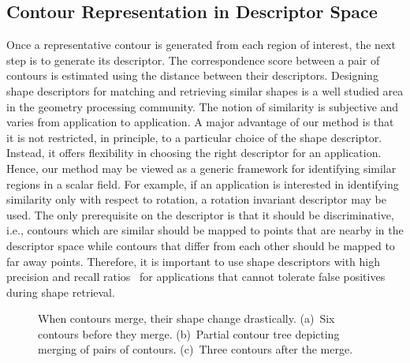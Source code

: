 \documentclass[review,journal]{vgtc}         %
\begin{document}
\subsection{Contour Representation in Descriptor Space}
Once a representative contour is generated from each region of interest, the next step
is to generate its descriptor. The correspondence score between a pair of
contours is estimated using the distance between their descriptors.
Designing shape descriptors for matching and retrieving similar shapes is a well studied 
area in the geometry processing community. 
The notion of similarity is subjective and varies from application to application.
A major advantage of our method is that it is not restricted, in principle, to a particular choice
of the shape descriptor. Instead, it offers flexibility in choosing 
the right descriptor for an application.  Hence, our method may be viewed as a generic framework for identifying
similar regions in a scalar field. For example, if an application is interested in 
identifying similarity only with respect to rotation, a rotation invariant descriptor may be used. 
The only prerequisite on the descriptor is that it should be discriminative, i.e., contours which are 
similar should be mapped to points that are nearby in the descriptor space while contours that differ 
from each other should be mapped to far away points. Therefore, it is important to use shape descriptors 
with high precision and recall ratios~\cite{lian2013} for applications that cannot tolerate false 
positives during shape retrieval.
\begin{figure}[b]
	\centering
	\caption{\label{ct-merge}When contours merge, their shape change drastically. 
		(a)~Six contours before they merge. (b)~Partial contour tree depicting
	merging of pairs of contours. (c)~Three contours after the merge.}
\end{figure}
\end{document}
